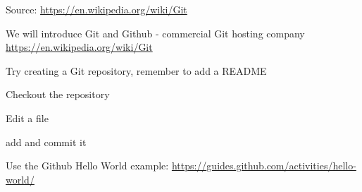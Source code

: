 \documentclass[Screen16to9,17pt]{foils}
\begin{document}
Source: \url{https://en.wikipedia.org/wiki/Git}

\begin{list2}
\item We will introduce Git and Github - commercial Git hosting company\\
\url{https://en.wikipedia.org/wiki/Git}
\item Try creating a Git repository, remember to add a README
\item Checkout the repository
\item Edit a file
\item add and commit it
\end{list2}

Use the Github Hello World example: \url{https://guides.github.com/activities/hello-world/}







\slidenext{}
\end{document}

